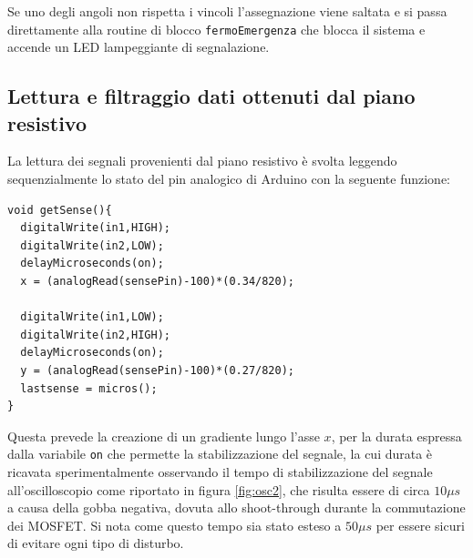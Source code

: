 \documentclass[12pt,twoside,openright]{report}
\begin{document}
Se uno degli angoli non rispetta i vincoli l'assegnazione viene saltata e si passa direttamente alla routine di blocco \texttt{fermoEmergenza} che blocca il sistema e accende un LED lampeggiante di segnalazione.

\subsection{Lettura e filtraggio dati ottenuti dal piano resistivo}
La lettura dei segnali provenienti dal piano resistivo è svolta leggendo sequenzialmente lo stato del pin analogico di Arduino con la seguente funzione:
\begin{verbatim}
void getSense(){
  digitalWrite(in1,HIGH);
  digitalWrite(in2,LOW);
  delayMicroseconds(on);
  x = (analogRead(sensePin)-100)*(0.34/820);

  digitalWrite(in1,LOW);
  digitalWrite(in2,HIGH);
  delayMicroseconds(on);
  y = (analogRead(sensePin)-100)*(0.27/820);
  lastsense = micros();
}
\end{verbatim}
Questa prevede la creazione di un gradiente lungo l'asse $x$, per la durata espressa dalla variabile \texttt{on} che permette la stabilizzazione del segnale, la cui durata è ricavata sperimentalmente osservando il tempo di stabilizzazione del segnale all'oscilloscopio come riportato in figura \ref{fig:osc2}, che risulta essere di circa $10\mu s$ a causa della gobba negativa, dovuta allo shoot-through durante la commutazione dei MOSFET. Si nota come questo tempo sia stato esteso a $50 \mu s$ per essere sicuri di evitare ogni tipo di disturbo.
\end{document}
